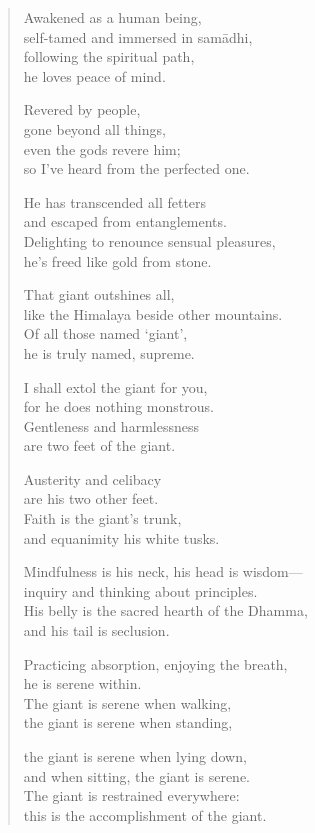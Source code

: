 \documentclass[12pt,openany]{book}%
\begin{document}
\begin{verse}%
Awakened as a human being, \\
self-tamed and immersed in \textsanskrit{samādhi}, \\
following the spiritual path, \\
he loves peace of mind. 

Revered by people, \\
gone beyond all things, \\
even the gods revere him; \\
so I’ve heard from the perfected one. 

He has transcended all fetters \\
and escaped from entanglements. \\
Delighting to renounce sensual pleasures, \\
he’s freed like gold from stone. 

That giant outshines all, \\
like the Himalaya beside other mountains. \\
Of all those named ‘giant’, \\
he is truly named, supreme. 

I shall extol the giant for you, \\
for he does nothing monstrous. \\
Gentleness and harmlessness \\
are two feet of the giant. 

Austerity and celibacy \\
are his two other feet. \\
Faith is the giant’s trunk, \\
and equanimity his white tusks. 

Mindfulness is his neck, his head is wisdom—\\
inquiry and thinking about principles. \\
His belly is the sacred hearth of the Dhamma, \\
and his tail is seclusion. 

Practicing absorption, enjoying the breath, \\
he is serene within. \\
The giant is serene when walking, \\
the giant is serene when standing, 

the giant is serene when lying down, \\
and when sitting, the giant is serene. \\
The giant is restrained everywhere: \\
this is the accomplishment of the giant. 


\end{verse}
\end{document}
